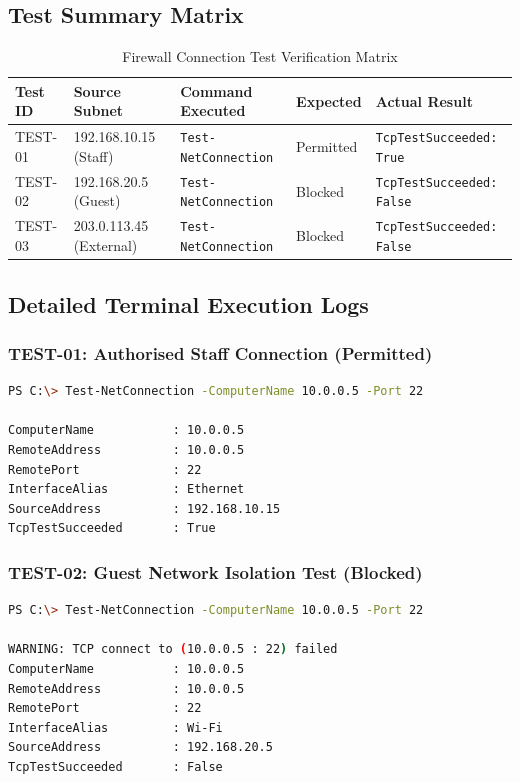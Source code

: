 \documentclass[12pt,a4paper]{article}
\begin{document}
\subsection{Test Summary Matrix}
\begin{table}[h!]
\centering
\small
\begin{tabular}{@{}lllll@{}}
\toprule
\textbf{Test ID} & \textbf{Source Subnet} & \textbf{Command Executed} & \textbf{Expected} & \textbf{Actual Result} \\ \midrule
TEST-01 & 192.168.10.15 (Staff) & \texttt{Test-NetConnection} & Permitted & \texttt{TcpTestSucceeded: True} \\
TEST-02 & 192.168.20.5 (Guest) & \texttt{Test-NetConnection} & Blocked & \texttt{TcpTestSucceeded: False} \\
TEST-03 & 203.0.113.45 (External) & \texttt{Test-NetConnection} & Blocked & \texttt{TcpTestSucceeded: False} \\ \bottomrule
\end{tabular}
\caption{Firewall Connection Test Verification Matrix}
\end{table}

\subsection{Detailed Terminal Execution Logs}

\subsubsection*{TEST-01: Authorised Staff Connection (Permitted)}
\begin{lstlisting}[language=bash]
PS C:\> Test-NetConnection -ComputerName 10.0.0.5 -Port 22

ComputerName           : 10.0.0.5
RemoteAddress          : 10.0.0.5
RemotePort             : 22
InterfaceAlias         : Ethernet
SourceAddress          : 192.168.10.15
TcpTestSucceeded       : True
\end{lstlisting}

\subsubsection*{TEST-02: Guest Network Isolation Test (Blocked)}
\begin{lstlisting}[language=bash]
PS C:\> Test-NetConnection -ComputerName 10.0.0.5 -Port 22

WARNING: TCP connect to (10.0.0.5 : 22) failed
ComputerName           : 10.0.0.5
RemoteAddress          : 10.0.0.5
RemotePort             : 22
InterfaceAlias         : Wi-Fi
SourceAddress          : 192.168.20.5
TcpTestSucceeded       : False
\end{lstlisting}
\end{document}
